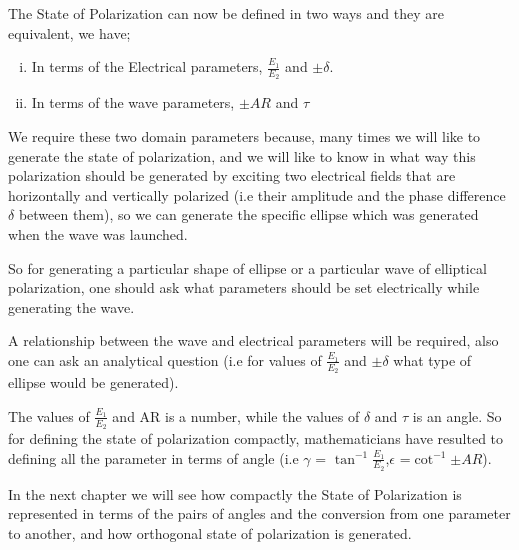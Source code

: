 The State of Polarization can now be defined in two ways and they are equivalent, we have;
\begin{enumerate}[(i)]
\item In terms of the Electrical parameters, $\frac{E_1}{E_2}$ and $\pm \delta $.
\item In terms of the wave parameters, $\pm AR $ and $\tau $
\end{enumerate}
We require these two domain parameters because, many times we will like to generate the state of polarization, and we will like to know in what way this polarization should be generated by exciting two electrical fields that are horizontally and vertically polarized (i.e their amplitude and the phase difference $\delta $ between them), so we can generate the specific ellipse which was generated when the wave was launched.

So for generating a particular shape of ellipse or a particular wave of elliptical polarization, one should ask what parameters should be set electrically while generating the wave.

A relationship between the wave and electrical parameters will be required, also one can ask an analytical question (i.e for values of $\frac{E_1}{E_2} $ and $ \pm \delta $ what type of ellipse would be generated).

The values of $\frac{E_1}{E_2}$ and AR is a number, while the values of $\delta$ and $\tau $ is an angle. So for defining the state of polarization compactly, mathematicians have resulted to defining all the parameter in terms of angle (i.e $\gamma $ = $\tan^{-1} {\frac{E_1}{E_2}} $,$\epsilon $ =$ \cot^{-1} {\pm AR} $). 

In the next chapter we will see how compactly the State of Polarization is represented in terms of the pairs of angles and the conversion from one parameter to another, and how orthogonal state of polarization is generated.